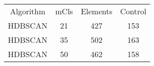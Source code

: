 \begin{table}
\begin{tabular}{cccc}
Algorithm & mCls & Elements & Control \\
HDBSCAN & 21 & 427 & 153 \\
HDBSCAN & 35 & 502 & 163 \\
HDBSCAN & 50 & 462 & 158 \\
\end{tabular}
\end{table}
